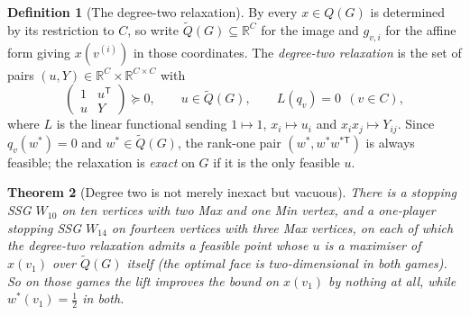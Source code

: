 \documentclass[11pt]{article}
\theoremstyle{plain}
\newtheorem{theorem}{Theorem}[section]
\theoremstyle{definition}
\newtheorem{definition}[theorem]{Definition}
\begin{document}
\begin{definition}[The degree-two relaxation]\label{def:lasserre-two}
By  every $x\in Q(G)$ is determined by its
restriction to $C$, so write $\tilde Q(G)\subseteq\mathbb R^{C}$ for the
image and $g_{v,i}$ for the affine form giving $x(v^{(i)})$ in those
coordinates. The \emph{degree-two relaxation} is the set of pairs
$(u,Y)\in\mathbb R^{C}\times\mathbb R^{C\times C}$ with
\[
  \begin{pmatrix}1&u^{\mathsf T}\\ u&Y\end{pmatrix}\succeq0,\qquad
  u\in\tilde Q(G),\qquad
  L(q_v)=0\ \ (v\in C),
\]
where $L$ is the linear functional sending $1\mapsto1$, $x_i\mapsto u_i$ and
$x_ix_j\mapsto Y_{ij}$. Since $q_v(w^\ast)=0$ and $w^\ast\in\tilde Q(G)$, the
rank-one pair $(w^\ast,w^\ast w^{\ast\mathsf T})$ is always feasible; the
relaxation is \emph{exact} on $G$ if it is the only feasible $u$.
\end{definition}

\begin{theorem}[Degree two is not merely inexact but vacuous]\label{thm:lasserre-vacuous}
There is a stopping SSG $W_{10}$ on ten vertices with two Max and one Min
vertex, and a one-player stopping SSG $W_{14}$ on fourteen vertices with
three Max vertices, on each of which the degree-two relaxation admits a
feasible point whose $u$ is a maximiser of $x(v_1)$ over $\tilde Q(G)$
itself (the optimal face is two-dimensional in both games). So on those games the lift improves the bound on $x(v_1)$ by
nothing at all, while $w^\ast(v_1)=\tfrac12$ in both.
\end{theorem}
\end{document}
